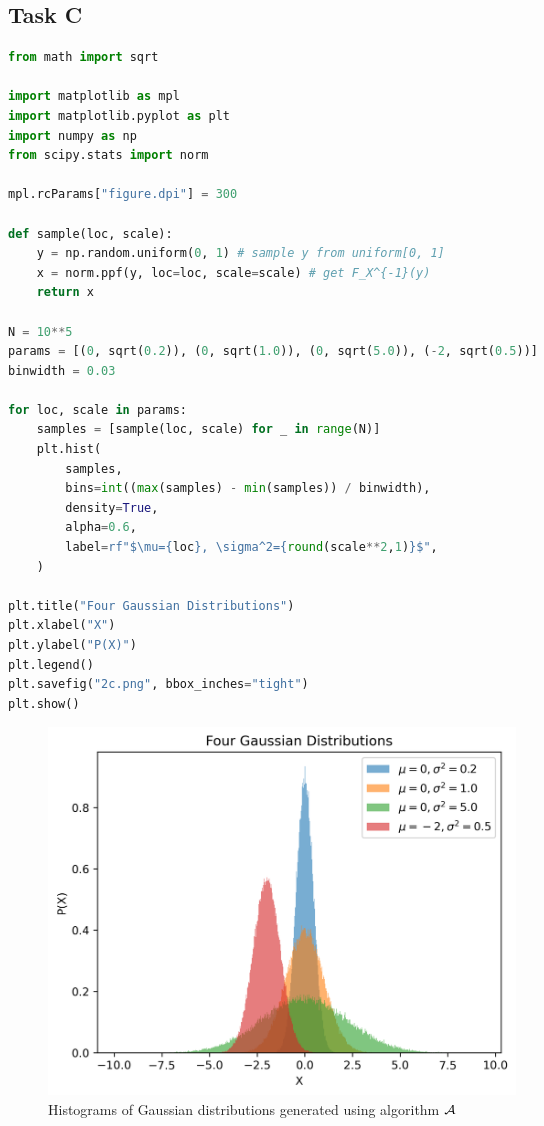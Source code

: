 \subsection*{Task C}
\begin{lstlisting}[language=Python, caption={Python code to implement algorithm $\cal{A}$ and plot their histograms}, label=lst:gaussian-algo]
from math import sqrt

import matplotlib as mpl
import matplotlib.pyplot as plt
import numpy as np
from scipy.stats import norm

mpl.rcParams["figure.dpi"] = 300

def sample(loc, scale):
    y = np.random.uniform(0, 1) # sample y from uniform[0, 1]
    x = norm.ppf(y, loc=loc, scale=scale) # get F_X^{-1}(y)
    return x

N = 10**5
params = [(0, sqrt(0.2)), (0, sqrt(1.0)), (0, sqrt(5.0)), (-2, sqrt(0.5))]
binwidth = 0.03

for loc, scale in params:
    samples = [sample(loc, scale) for _ in range(N)]
    plt.hist(
        samples,
        bins=int((max(samples) - min(samples)) / binwidth),
        density=True,
        alpha=0.6,
        label=rf"$\mu={loc}, \sigma^2={round(scale**2,1)}$",
    )

plt.title("Four Gaussian Distributions")
plt.xlabel("X")
plt.ylabel("P(X)")
plt.legend()
plt.savefig("2c.png", bbox_inches="tight")
plt.show()
\end{lstlisting}
\begin{figure}[H]
	\centering
	\includegraphics[width=0.6\textwidth]{img/2c.png}
	\caption{Histograms of Gaussian distributions generated using algorithm $\cal{A}$}
\end{figure}

